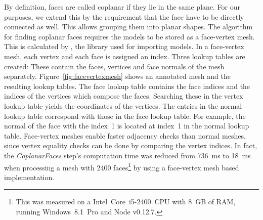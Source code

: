 \documentclass[../ClassicThesis.tex]{subfiles}
\begin{document}
By definition, faces are called coplanar if they lie in the same plane. For our purposes, we extend this by the requirement that the face have to be directly connected as well. This allows grouping them into planar shapes. The algorithm for finding coplanar faces requires the models to be stored as a face-vertex mesh. This is calculated by \meshlib{}, the library used for importing models. In a face-vertex mesh, each vertex and each face is assigned an index. Three lookup tables are created: These contain the faces, vertices and face normals of the mesh separately. Figure~\ref{fig:facevertexmesh} shows an annotated mesh and the resulting lookup tables. The face lookup table contains the face indices and the indices of the vertices which compose the faces. Searching these in the vertex lookup table yields the coordinates of the vertices. The entries in the normal lookup table correspond with those in the face lookup table. For example, the normal of the face with the index~1 is located at index~1 in the normal lookup table. Face-vertex meshes enable faster adjacency checks than normal meshes, since vertex equality checks can be done by comparing the vertex indices. In fact, the \emph{CoplanarFaces} step's computation time was reduced from 736~ms to 18~ms when processing a mesh with 2400 faces\footnote{This was measured on a Intel\textregistered{}~Core\texttrademark{}~i5-2400~CPU with 8~GB of RAM, running Windows~8.1~Pro and Node v0.12.7.} by using a face-vertex mesh based implementation.
\end{document}
